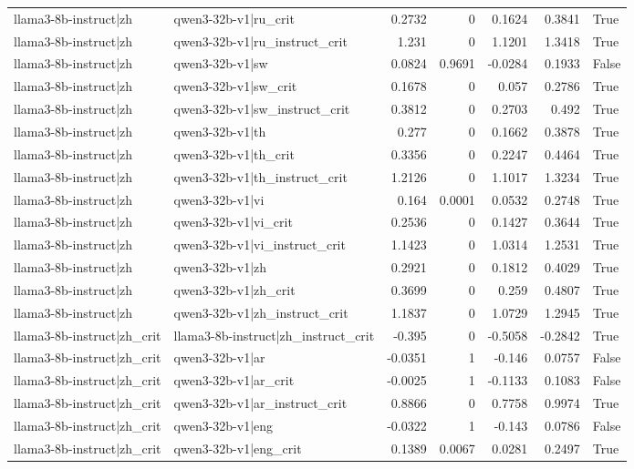 \begin{table}
\begin{tabular}{l l r r r r l}
llama3-8b-instruct|zh & qwen3-32b-v1|ru_crit & 0.2732 & 0 & 0.1624 & 0.3841 & True \\
llama3-8b-instruct|zh & qwen3-32b-v1|ru_instruct_crit & 1.231 & 0 & 1.1201 & 1.3418 & True \\
llama3-8b-instruct|zh & qwen3-32b-v1|sw & 0.0824 & 0.9691 & -0.0284 & 0.1933 & False \\
llama3-8b-instruct|zh & qwen3-32b-v1|sw_crit & 0.1678 & 0 & 0.057 & 0.2786 & True \\
llama3-8b-instruct|zh & qwen3-32b-v1|sw_instruct_crit & 0.3812 & 0 & 0.2703 & 0.492 & True \\
llama3-8b-instruct|zh & qwen3-32b-v1|th & 0.277 & 0 & 0.1662 & 0.3878 & True \\
llama3-8b-instruct|zh & qwen3-32b-v1|th_crit & 0.3356 & 0 & 0.2247 & 0.4464 & True \\
llama3-8b-instruct|zh & qwen3-32b-v1|th_instruct_crit & 1.2126 & 0 & 1.1017 & 1.3234 & True \\
llama3-8b-instruct|zh & qwen3-32b-v1|vi & 0.164 & 0.0001 & 0.0532 & 0.2748 & True \\
llama3-8b-instruct|zh & qwen3-32b-v1|vi_crit & 0.2536 & 0 & 0.1427 & 0.3644 & True \\
llama3-8b-instruct|zh & qwen3-32b-v1|vi_instruct_crit & 1.1423 & 0 & 1.0314 & 1.2531 & True \\
llama3-8b-instruct|zh & qwen3-32b-v1|zh & 0.2921 & 0 & 0.1812 & 0.4029 & True \\
llama3-8b-instruct|zh & qwen3-32b-v1|zh_crit & 0.3699 & 0 & 0.259 & 0.4807 & True \\
llama3-8b-instruct|zh & qwen3-32b-v1|zh_instruct_crit & 1.1837 & 0 & 1.0729 & 1.2945 & True \\
llama3-8b-instruct|zh_crit & llama3-8b-instruct|zh_instruct_crit & -0.395 & 0 & -0.5058 & -0.2842 & True \\
llama3-8b-instruct|zh_crit & qwen3-32b-v1|ar & -0.0351 & 1 & -0.146 & 0.0757 & False \\
llama3-8b-instruct|zh_crit & qwen3-32b-v1|ar_crit & -0.0025 & 1 & -0.1133 & 0.1083 & False \\
llama3-8b-instruct|zh_crit & qwen3-32b-v1|ar_instruct_crit & 0.8866 & 0 & 0.7758 & 0.9974 & True \\
llama3-8b-instruct|zh_crit & qwen3-32b-v1|eng & -0.0322 & 1 & -0.143 & 0.0786 & False \\
llama3-8b-instruct|zh_crit & qwen3-32b-v1|eng_crit & 0.1389 & 0.0067 & 0.0281 & 0.2497 & True \\

\end{tabular}
\end{table}
